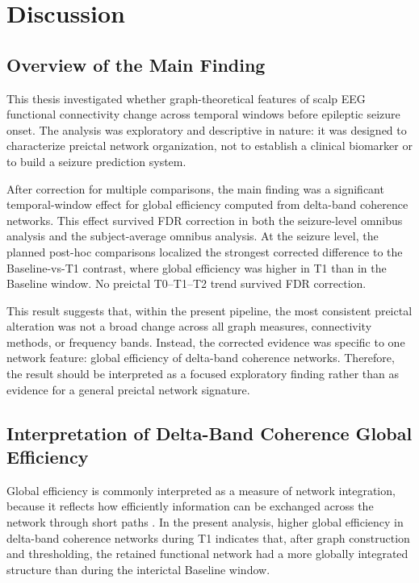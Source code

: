 \chapter{Discussion}
\label{chap:discussion}

\section{Overview of the Main Finding}
\label{sec:discussion-main-finding}

This thesis investigated whether graph-theoretical features of scalp EEG
functional connectivity change across temporal windows before epileptic seizure
onset. The analysis was exploratory and descriptive in nature: it was designed
to characterize preictal network organization, not to establish a clinical
biomarker or to build a seizure prediction system.

After correction for multiple comparisons, the main finding was a significant
temporal-window effect for global efficiency computed from delta-band coherence
networks. This effect survived FDR correction in both the seizure-level omnibus
analysis and the subject-average omnibus analysis. At the seizure level, the
planned post-hoc comparisons localized the strongest corrected difference to
the Baseline-vs-T1 contrast, where global efficiency was higher in T1 than in
the Baseline window. No preictal T0--T1--T2 trend survived FDR correction.

This result suggests that, within the present pipeline, the most consistent
preictal alteration was not a broad change across all graph measures,
connectivity methods, or frequency bands. Instead, the corrected evidence was
specific to one network feature: global efficiency of delta-band coherence
networks. Therefore, the result should be interpreted as a focused exploratory
finding rather than as evidence for a general preictal network signature.

\section{Interpretation of Delta-Band Coherence Global Efficiency}
\label{sec:discussion-delta-coherence-efficiency}

Global efficiency is commonly interpreted as a measure of network integration,
because it reflects how efficiently information can be exchanged across the
network through short paths \cite{Latora2001,Rubinov2010}. In the present
analysis, higher global efficiency in delta-band coherence networks during T1
indicates that, after graph construction and thresholding, the retained
functional network had a more globally integrated structure than during the
interictal Baseline window.

